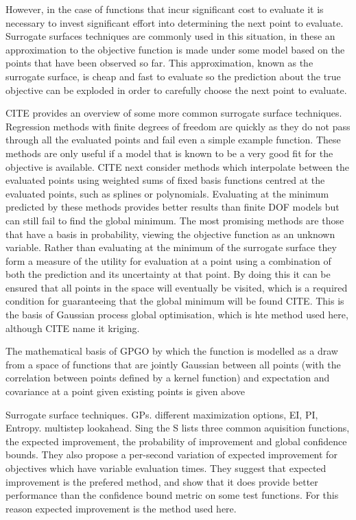 \documentclass[a4paper, 10 pt, conference]{ieeeconf}  %
\begin{document}
However, in the case of functions that incur significant cost to evaluate it is necessary to invest significant effort into determining the next point to evaluate. Surrogate surfaces techniques are commonly used in this situation, in these an approximation to the objective function is made under some model based on the points that have been observed so far. This approximation, known as the surrogate surface, is cheap and fast to evaluate so the prediction about the true objective can be exploded in order to carefully choose the next point to evaluate.

CITE provides an overview of some more common surrogate surface techniques. Regression methods with finite degrees of freedom are quickly as they do not pass through all the evaluated points and fail even a simple example function. These methods are only useful if a model that is known to be a very good fit for the objective is available. CITE next consider methods which interpolate between the evaluated points using weighted sums of fixed basis functions centred at the evaluated points, such as splines or polynomials. Evaluating at the minimum predicted by these methods provides better results than finite DOF models but can still fail to find the global minimum. The most promising methods are those that have a basis in probability, viewing the objective function as an unknown variable. Rather than evaluating at the minimum of the surrogate surface they form a measure of the utility for evaluation at a point using a combination of both the prediction and its uncertainty at that point. By doing this it can be ensured that all points in the space will eventually be visited, which is a required condition for guaranteeing that the global minimum will be found CITE. This is the basis of Gaussian process global optimisation, which is hte method used here, although CITE name it kriging.

The mathematical basis of GPGO by which the function is modelled as a draw from a space of functions that are jointly Gaussian between all points (with the correlation between points defined by a kernel function) and expectation and covariance at a point given existing points is given above

Surrogate surface techniques. GPs. different maximization options, EI, PI, Entropy. multistep lookahead. Sing the S
\cite{} lists three common aquisition functions, the expected improvement, the probability of improvement and global confidence bounds. They also propose a per-second variation of expected improvement for objectives which have variable evaluation times. They suggest that expected improvement is the prefered method, and show that it does provide better performance than the confidence bound metric on some test functions. For this reason expected improvement is the method used here.
\end{document}
